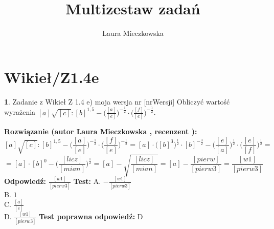 \documentclass[12pt, a4paper]{article}
\title{Multizestaw zadań}
\author{Laura Mieczkowska}
\date{}
\theoremstyle{definition} %
\newtheorem{zad}{}
\newcommand{\kategoria}[1]{\section{#1}} %
\newcommand{\zadStart}[1]{\begin{zad}#1\newline} %
\newcommand{\zadStop}{\end{zad}}   %
\newcommand{\rozwStart}[2]{\noindent \textbf{Rozwiązanie (autor #1 , recenzent #2): }\newline} %
\newcommand{\odpStart}{\noindent \textbf{Odpowiedź:}\newline}    %
\newcommand{\odpStop}{\newline}                                             %
\newcommand{\testStart}{\noindent \textbf{Test:}\newline} %
\newcommand{\testStop}{\newline} %
\newcommand{\kluczStart}{\noindent \textbf{Test poprawna odpowiedź:}\newline} %
\newcommand{\kluczStop}{\newline} %
\begin{document}
\maketitle


\kategoria{Wikieł/Z1.4e}
\zadStart{Zadanie z Wikieł Z 1.4 e) moja wersja nr [nrWersji]}
Obliczyć wartość wyrażenia $[a]\sqrt{[c]}:[b]^{1,5}-\big(\frac{[a]}{[e]}\big)^{-\frac{1}{2}}\cdot\big(\frac{[f]}{[e]}\big)^{-\frac{1}{2}}$.
\zadStop
\rozwStart{Laura Mieczkowska}{}
$$[a]\sqrt{[c]}:[b]^{1,5}-\bigg(\frac{[a]}{[e]}\bigg)^{-\frac{1}{2}}\cdot\bigg(\frac{[f]}{[e]}\bigg)^{-\frac{1}{2}}=
[a]\cdot\big([b]^3\big)^{\frac{1}{2}}\cdot[b]^{-\frac{3}{2}}-\bigg(\frac{[e]}{[a]}\bigg)^{\frac{1}{2}}\cdot\bigg(\frac{[e]}{[f]}\bigg)^{\frac{1}{2}}=$$
$$=[a]\cdot[b]^{0}-\bigg(\frac{[licz]}{[mian]}\bigg)^{\frac{1}{2}}=
[a]-\sqrt{\frac{[licz]}{[mian]}}=[a]-\frac{[pierw]}{[pierw3]}=\frac{[w1]}{[pierw3]}$$
\odpStart
$\frac{[w1]}{[pierw3]}$
\odpStop
\testStart
A. $-\frac{[w1]}{[pierw3]}$ \\
B. $1$ \\
C. $\frac{[a]}{[e]}$ \\
D. $\frac{[w1]}{[pierw3]}$ 
\testStop
\kluczStart
D
\kluczStop
\end{document}
